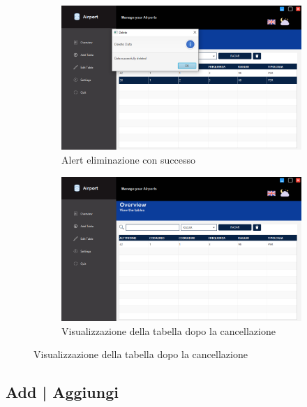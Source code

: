 \begin{figure}[H]
	\begin{subfigure}{.6\textwidth}
		\centering
		\includegraphics[width=1\linewidth]{./img/Applicativo/delete_data_success.png}
		\caption{Alert eliminazione con successo}
		\label{fig:delete_alert_success}
	\end{subfigure}%
	\begin{subfigure}{.6\textwidth}
		\centering
		\includegraphics[width=1\linewidth]{./img/Applicativo/delete_data_aftermath.png}
		\caption{Visualizzazione della tabella dopo la cancellazione}
		\label{fig:delete_data_aftermath}
	\end{subfigure}
	\label{fig:overviews2}
\end{figure}


\newpage

\subsection{Add | Aggiungi}

